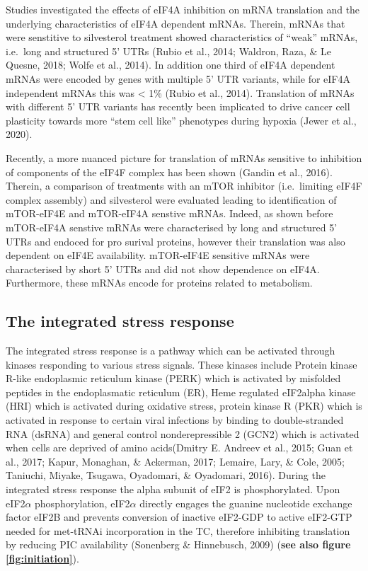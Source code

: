 \documentclass[
  12pt,
  openany]{book}
\begin{document}
Studies investigated the effects of eIF4A inhibition on mRNA translation and the underlying characteristics of eIF4A dependent mRNAs. Therein, mRNAs that were senstitive to silvesterol treatment showed characteristics of ``weak'' mRNAs, i.e.~long and structured 5' UTRs (Rubio et al., 2014; Waldron, Raza, \& Le Quesne, 2018; Wolfe et al., 2014). In addition one third of eIF4A dependent mRNAs were encoded by genes with multiple 5' UTR variants, while for eIF4A independent mRNAs this was \textless{} 1\% (Rubio et al., 2014). Translation of mRNAs with different 5' UTR variants has recently been implicated to drive cancer cell plasticity towards more ``stem cell like'' phenotypes during hypoxia (Jewer et al., 2020).

Recently, a more nuanced picture for translation of mRNAs sensitive to inhibition of components of the eIF4F complex has been shown (Gandin et al., 2016). Therein, a comparison of treatments with an mTOR inhibitor (i.e.~limiting eIF4F complex assembly) and silvesterol were evaluated leading to identification of mTOR-eIF4E and mTOR-eIF4A senstive mRNAs. Indeed, as shown before mTOR-eIF4A senstive mRNAs were characterised by long and structured 5' UTRs and endoced for pro surival proteins, however their translation was also dependent on eIF4E availability. mTOR-eIF4E sensitive mRNAs were characterised by short 5' UTRs and did not show dependence on eIF4A. Furthermore, these mRNAs encode for proteins related to metabolism.

\subsection{The integrated stress response}

The integrated stress response is a pathway which can be activated through kinases responding to various stress signals. These kinases include Protein kinase R-like endoplasmic reticulum kinase (PERK) which is activated by misfolded peptides in the endoplasmatic reticulum (ER), Heme regulated eIF2alpha kinase (HRI) which is activated during oxidative stress, protein kinase R (PKR) which is activated in response to certain viral infections by binding to double-stranded RNA (dsRNA) and general control nonderepressible 2 (GCN2) which is activated when cells are deprived of amino acids(Dmitry E. Andreev et al., 2015; Guan et al., 2017; Kapur, Monaghan, \& Ackerman, 2017; Lemaire, Lary, \& Cole, 2005; Taniuchi, Miyake, Tsugawa, Oyadomari, \& Oyadomari, 2016). During the integrated stress response the alpha subunit of eIF2 is phosphorylated. Upon eIF2\(\alpha\) phosphorylation, eIF2\(\alpha\) directly engages the guanine nucleotide exchange factor eIF2B and prevents conversion of inactive eIF2-GDP to active eIF2-GTP needed for met-tRNAi incorporation in the TC, therefore inhibiting translation by reducing PIC availability (Sonenberg \& Hinnebusch, 2009) (\textbf{see also figure \ref{fig:initiation}}).
\end{document}
